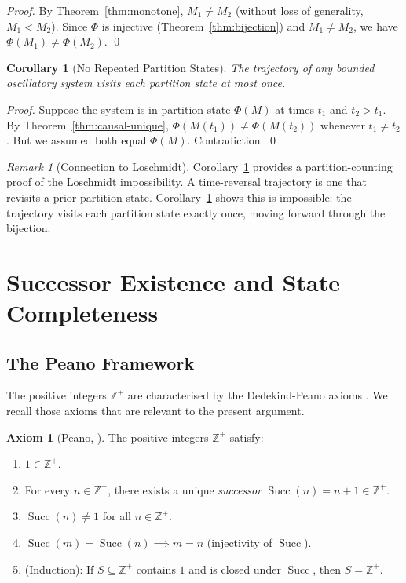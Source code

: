 \documentclass[twocolumn,10pt,a4paper]{article}
\theoremstyle{thmstyle}
\newtheorem{corollary}[theorem]{Corollary}
\theoremstyle{definition}
\newtheorem{axiom}{Axiom}
\theoremstyle{remark}
\newtheorem{remark}[theorem]{Remark}
\DeclareMathOperator{\Succ}{Succ}
\newcommand{\Zp}{\mathbb{Z}^{+}}
\newcommand{\PhiMap}{\varPhi}
\begin{document}
\begin{proof}
By Theorem~\ref{thm:monotone}, $M_1 \neq M_2$ (without loss of generality, $M_1 < M_2$). Since $\PhiMap$ is injective (Theorem~\ref{thm:bijection}) and $M_1 \neq M_2$, we have $\PhiMap(M_1) \neq \PhiMap(M_2)$. \qed
\end{proof}

\begin{corollary}[No Repeated Partition States]
\label{cor:no-repeat}
The trajectory of any bounded oscillatory system visits each partition state at most once.
\end{corollary}

\begin{proof}
Suppose the system is in partition state $\PhiMap(M)$ at times $t_1$ and $t_2 > t_1$. By Theorem~\ref{thm:causal-unique}, $\PhiMap(M(t_1)) \neq \PhiMap(M(t_2))$ whenever $t_1 \neq t_2$. But we assumed both equal $\PhiMap(M)$. Contradiction. \qed
\end{proof}

\begin{remark}[Connection to Loschmidt]
Corollary~\ref{cor:no-repeat} provides a partition-counting proof of the Loschmidt impossibility. A time-reversal trajectory is one that revisits a prior partition state. Corollary~\ref{cor:no-repeat} shows this is impossible: the trajectory visits each partition state exactly once, moving forward through the bijection.
\end{remark}

\section{Successor Existence and State Completeness}
\label{sec:successor}

\subsection{The Peano Framework}

The positive integers $\Zp$ are characterised by the Dedekind-Peano axioms \citep{peano1889,dedekind1888}. We recall those axioms that are relevant to the present argument.

\begin{axiom}[Peano, \citealp{peano1889}]
\label{ax:peano}
The positive integers $\Zp$ satisfy:
\begin{enumerate}[leftmargin=1.5em,label=(P\arabic*),itemsep=0.1em]
\item $1 \in \Zp$.
\item For every $n \in \Zp$, there exists a unique \emph{successor} $\Succ(n) = n + 1 \in \Zp$.
\item $\Succ(n) \neq 1$ for all $n \in \Zp$.
\item $\Succ(m) = \Succ(n) \implies m = n$ (injectivity of $\Succ$).
\item (Induction): If $S \subseteq \Zp$ contains $1$ and is closed under $\Succ$, then $S = \Zp$.
\end{enumerate}
\end{axiom}
\end{document}

